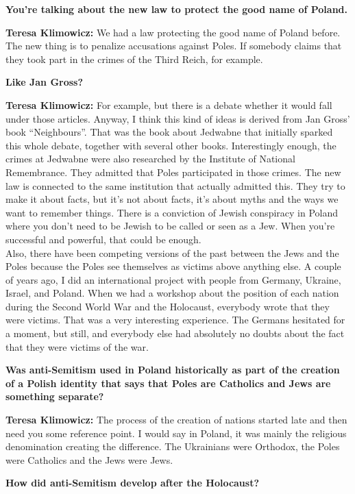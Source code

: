 \textbf{You're talking about the new law to protect the good name of Poland.} 

\textbf{Teresa Klimowicz:} We had a law protecting the good name of Poland before. The new thing is to penalize accusations against Poles. If somebody claims that they took part in the crimes of the Third Reich, for example. 

\textbf{Like Jan Gross?} 

\textbf{Teresa Klimowicz:} For example, but there is a debate whether it would fall under those articles. Anyway, I think this kind of ideas is derived from Jan Gross’ book ``Neighbours''. That was the book about Jedwabne that initially sparked this whole debate, together with several other books. Interestingly enough, the crimes at Jedwabne were also researched by the Institute of National Remembrance. They admitted that Poles participated in those crimes. The new law is connected to the same institution that actually admitted this. They try to make it about facts, but it's not about facts, it's about myths and the ways we want to remember things. There is a conviction of Jewish conspiracy in Poland where you don't need to be Jewish to be called or seen as a Jew. When you’re successful and powerful, that could be enough.\\ 
Also, there have been competing versions of the past between the Jews and the Poles because the Poles see themselves as victims above anything else. A couple of years ago, I did an international project with people from Germany, Ukraine, Israel, and Poland. When we had a workshop about the position of each nation during the Second World War and the Holocaust, everybody wrote that they were victims. That was a very interesting experience. The Germans hesitated for a moment, but still, and everybody else had absolutely no doubts about the fact that they were victims of the war.  

\textbf{Was anti-Semitism used in Poland historically as part of the creation of a Polish identity that says that Poles are Catholics and Jews are something separate?} 

\textbf{Teresa Klimowicz:} The process of the creation of nations started late and then need you some reference point. I would say in Poland, it was mainly the religious denomination creating the difference. The Ukrainians were Orthodox, the Poles were Catholics and the Jews were Jews.  

\textbf{How did anti-Semitism develop after the Holocaust?}  

